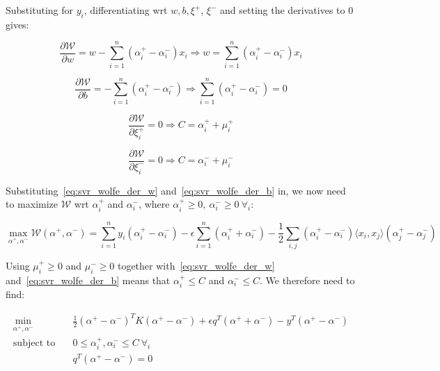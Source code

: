 Substituting for $y_i$, differentiating wrt $w, b, \xi^+$, $\xi^-$ and setting the derivatives to $0$ gives:

\begin{equation} \label{eq:svr_wolfe_der_w}
	\frac{\partial \mathcal{W}}{\partial w}=w-\sum_{i=1}^n (\alpha_i^+ - \alpha_i^-) x_i \Rightarrow w=\sum_{i=1}^n (\alpha_i^+ - \alpha_i^-) x_i
\end{equation}

\begin{equation} \label{eq:svr_wolfe_der_b}
	\frac{\partial \mathcal{W}}{\partial b}=-\sum_{i=1}^n (\alpha_i^+ - \alpha_i^-)\Rightarrow \sum_{i=1}^n (\alpha_i^+ - \alpha_i^-)=0
\end{equation}

\begin{equation}\label{eq:svr_wolfe_der_xip}
	\frac{\partial \mathcal{W}}{\partial\xi_i^+}=0\Rightarrow C=\alpha_i^+ + \mu_i^+
\end{equation}

\begin{equation} \label{eq:svr_wolfe_der_xim}
	\frac{\partial \mathcal{W}}{\partial\xi_i^-}=0\Rightarrow C=\alpha_i^- + \mu_i^-
\end{equation}

Substituting~\eqref{eq:svr_wolfe_der_w} and~\eqref{eq:svr_wolfe_der_b} in, we now need to maximize $\mathcal{W}$ wrt $\alpha_i^+$ and $\alpha_i^-$, where $\alpha_i^+ \geq 0,\ \alpha_i^- \geq 0 \ \forall_i$:

\begin{equation} \label{eq:svr_max_wolfe_dual}
    \max_{\alpha^+,\alpha^-} \mathcal{W}(\alpha^+,\alpha^-) = \sum_{i=1}^n y_i(\alpha_i^+ - \alpha_i^-)-\epsilon\sum_{i=1}^n (\alpha_i^+ + \alpha_i^-)-\frac{1}{2}\sum_{i,j}(\alpha_i^+ - \alpha_i^-)\langle x_i, x_j \rangle(\alpha_j ^+ - \alpha_j ^-)
\end{equation}

Using $\mu_i^+ \geq 0$ and $\mu_i^- \geq 0$ together with~\eqref{eq:svr_wolfe_der_w} and~\eqref{eq:svr_wolfe_der_b} means that $\alpha_i^+ \leq C$ and $\alpha_i^- \leq C$. We therefore need to find:

\begin{equation} \label{eq:svr_min_wolfe_dual}
    \begin{aligned}
        \min_{\alpha^+,\alpha^-} \quad & \frac{1}{2}(\alpha^+ - \alpha^-)^TK(\alpha^+ - \alpha^-)+\epsilon q^T(\alpha^+ + \alpha^-)-y^T(\alpha^+ - \alpha^-) \\
            \text{subject to} \quad & 0\leq\alpha_i^+,\alpha_i^- \leq C \ \forall_i \\ & q^T(\alpha^+ - \alpha^-)=0
    \end{aligned}
\end{equation}

